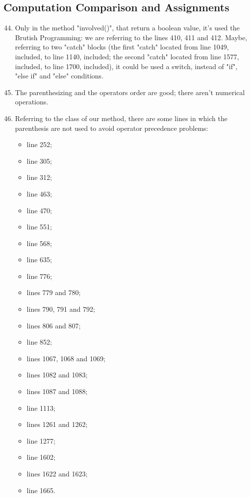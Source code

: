 \subsection{Computation Comparison and Assignments}
\begin{enumerate}
	\setcounter{enumi}{43}
	\item Only in the method "involved()", that return a boolean value, it's used the Brutish Programming: we are referring to the lines 410, 411 and 412. Maybe, referring to two "catch" blocks (the first "catch" located from line 1049, included, to line 1140, included; the second "catch" located from line 1577, included, to line 1700, included), it could be used a switch, instead of "if", "else if" and "else" conditions. 
	\item The parenthesizing and the operators order are good; there aren't numerical operations.
	\item Referring to the class of our method, there are some lines in which the parenthesis are not used to avoid operator precedence problems:
	    \begin{itemize}
	        \item line 252;
	        \item line 305;
	        \item line 312;
	        \item line 463;
	        \item line 470;
	        \item line 551;
	        \item line 568;
	        \item line 635;
	        \item line 776;
	        \item lines 779 and 780;
	        \item lines 790, 791 and 792;
	        \item lines 806 and 807;
	        \item line 852;
	        \item lines 1067, 1068 and 1069;
	        \item lines 1082 and 1083;
	        \item lines 1087 and 1088;
	        \item line 1113;
	        \item lines 1261 and 1262;
	        \item line 1277;
	        \item line 1602;
	        \item lines 1622 and 1623;
	        \item line 1665. 

\end{itemize}
\end{enumerate}
